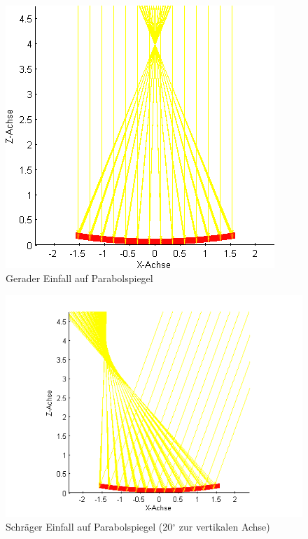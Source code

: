 \documentclass[fontsize=10pt,paper=a4,bibliography=totoc]{scrartcl}
\begin{document}
\begin{figure}[htb]
	\centering
	\includegraphics[width=\textwidth]{images/2d_gerade}
	\caption{Gerader Einfall auf Parabolspiegel}
	\label{pic:2dreflektion}
\end{figure}
\begin{figure}[htb]
	\centering
	\includegraphics[width=\textwidth]{images/2d_schraeg_20_grad}
	\caption{Schräger Einfall auf Parabolspiegel (20$^{\circ}$ zur vertikalen Achse)}
	\label{pic:2dreflektion_schraeg}
\end{figure}
\end{document}
